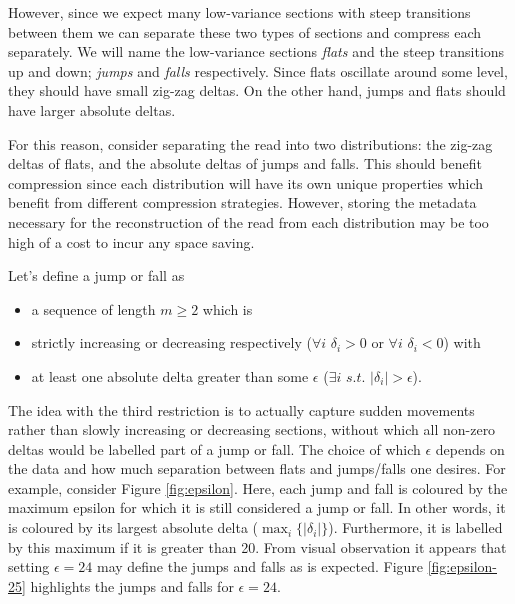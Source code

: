 However, since we expect many low-variance sections with steep transitions
between them we can separate these two types of sections and compress each
separately. We will name the low-variance sections \textit{flats} and the
steep transitions up and down; \textit{jumps} and \textit{falls} respectively.
Since flats oscillate around some level, they should have small zig-zag deltas.
On the other hand, jumps and flats should have larger absolute deltas.



For this reason, consider separating the read into two distributions: the
zig-zag deltas of flats, and the absolute deltas of jumps and falls. This should
benefit compression since each distribution will have its own unique properties
which benefit from different compression strategies. However, storing the
metadata necessary for the reconstruction of the read from each distribution may
be too high of a cost to incur any space saving.

Let's define a jump or fall as
\begin{itemize}
	\item a sequence of length $m\ge 2$ which is
	\item strictly increasing or decreasing respectively ($\forall i$ $\delta_i>0$ or $\forall i$ $\delta_i < 0$) with
	\item at least one absolute delta greater than some $\epsilon$ ($\exists i$ $s.t.$ $|\delta_i|>\epsilon$).
\end{itemize}

The idea with the third restriction is to actually capture sudden movements
rather than slowly increasing or decreasing sections, without which all non-zero
deltas would be labelled part of a jump or fall. The choice of which $\epsilon$
depends on the data and how much separation between flats and jumps/falls one
desires. For example, consider Figure \ref{fig:epsilon}. Here, each jump and fall
is coloured by the maximum epsilon for which it is still considered a jump or
fall. In other words, it is coloured by its largest absolute delta
($\max_i\{|\delta_i|\}$). Furthermore, it is labelled by this maximum if it is
greater than 20. From visual observation it appears that setting $\epsilon=24$
may define the jumps and falls as is expected. Figure \ref{fig:epsilon-25}
highlights the jumps and falls for $\epsilon=24$.

